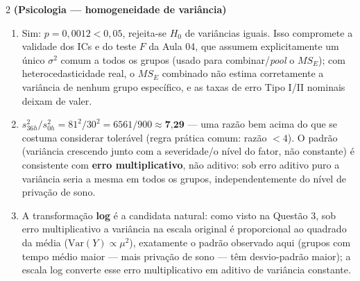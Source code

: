 \documentclass[11pt]{article}
\begin{document}
\begin{questao}{2} \textbf{(Psicologia --- homogeneidade de variância)}
\end{questao}
\begin{solucao}
\begin{enumerate}[label=(\alph*)]
  \item Sim: $p=0{,}0012 < 0{,}05$, rejeita-se $H_0$ de variâncias iguais. Isso compromete a
    validade dos ICs e do teste $F$ da Aula 04, que assumem explicitamente um único $\sigma^2$
    comum a todos os grupos (usado para combinar/\emph{pool} o $MS_E$); com heterocedasticidade
    real, o $MS_E$ combinado não estima corretamente a variância de nenhum grupo específico, e as
    taxas de erro Tipo I/II nominais deixam de valer.
  \item $s^2_{36h}/s^2_{0h} = 81^2/30^2 = 6561/900 \approx \textbf{7{,}29}$ --- uma razão bem
    acima do que se costuma considerar tolerável (regra prática comum: razão $<4$). O padrão
    (variância crescendo junto com a severidade/o nível do fator, não constante) é consistente com
    \textbf{erro multiplicativo}, não aditivo: sob erro aditivo puro a variância seria a mesma em
    todos os grupos, independentemente do nível de privação de sono.
  \item A transformação \textbf{log} é a candidata natural: como visto na Questão 3, sob erro
    multiplicativo a variância na escala original é proporcional ao quadrado da média
    ($\mathrm{Var}(Y)\propto\mu^2$), exatamente o padrão observado aqui (grupos com tempo médio
    maior --- mais privação de sono --- têm desvio-padrão maior); a escala log converte esse erro
    multiplicativo em aditivo de variância constante.
\end{enumerate}
\end{solucao}
\end{document}
